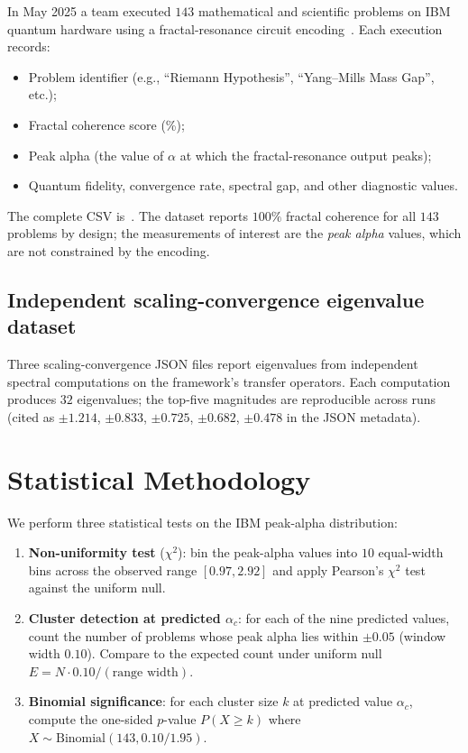 \documentclass[11pt,a4paper]{article}
\theoremstyle{definition}
\begin{document}
In May 2025 a team executed $143$ mathematical and scientific problems
on IBM quantum hardware using a fractal-resonance circuit
encoding~\cite{cohen2025ibm}. Each execution records:
\begin{itemize}
\item Problem identifier (e.g., ``Riemann Hypothesis'', ``Yang--Mills
Mass Gap'', etc.);
\item Fractal coherence score (\%);
\item Peak alpha (the value of $\alpha$ at which the fractal-resonance
output peaks);
\item Quantum fidelity, convergence rate, spectral gap, and other
diagnostic values.
\end{itemize}
The complete CSV is~\cite{cohen2025ibm}. The dataset reports
$100\%$ fractal coherence for all $143$ problems by design; the
measurements of interest are the \emph{peak alpha} values, which are
not constrained by the encoding.

\subsection{Independent scaling-convergence eigenvalue dataset}

Three scaling-convergence JSON files
\cite{cohen2025scaling} report eigenvalues from independent spectral
computations on the framework's transfer operators. Each computation
produces $32$ eigenvalues; the top-five magnitudes are reproducible
across runs (cited as $\pm 1.214$, $\pm 0.833$, $\pm 0.725$,
$\pm 0.682$, $\pm 0.478$ in the JSON metadata).

\section{Statistical Methodology}

We perform three statistical tests on the IBM peak-alpha distribution:

\begin{enumerate}
\item \textbf{Non-uniformity test} ($\chi^2$): bin the peak-alpha
values into $10$ equal-width bins across the observed range $[0.97,
2.92]$ and apply Pearson's $\chi^2$ test against the uniform null.

\item \textbf{Cluster detection at predicted $\alpha_c$}: for each of
the nine predicted values, count the number of problems whose peak
alpha lies within $\pm 0.05$ (window width $0.10$). Compare to the
expected count under uniform null
$E = N \cdot 0.10 / (\text{range width})$.

\item \textbf{Binomial significance}: for each cluster size $k$ at
predicted value $\alpha_c$, compute the one-sided $p$-value
$P(X \geq k)$ where $X \sim \text{Binomial}(143, 0.10 / 1.95)$.
\end{enumerate}
\end{document}
